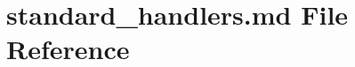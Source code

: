 \hypertarget{standard__handlers_8md}{\section{standard\-\_\-handlers.\-md File Reference}
\label{standard__handlers_8md}
}

